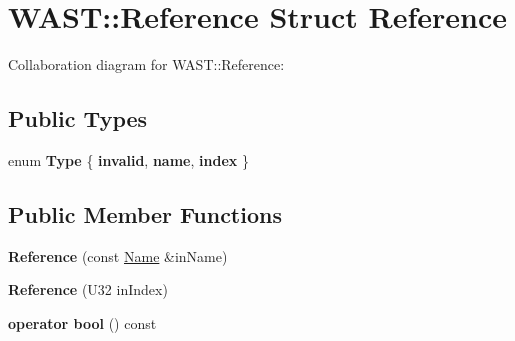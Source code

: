 \hypertarget{struct_w_a_s_t_1_1_reference}{}\section{W\+A\+ST\+:\+:Reference Struct Reference}
\label{struct_w_a_s_t_1_1_reference}


Collaboration diagram for W\+A\+ST\+:\+:Reference\+:
\subsection*{Public Types}
\begin{DoxyCompactItemize}
\item 
\mbox{\label{struct_w_a_s_t_1_1_reference_a89f893631191c7d9100fada8522b5f60}} 
enum {\bfseries Type} \{ {\bfseries invalid}, 
{\bfseries name}, 
{\bfseries index}
 \}
\end{DoxyCompactItemize}
\subsection*{Public Member Functions}
\begin{DoxyCompactItemize}
\item 
\mbox{\label{struct_w_a_s_t_1_1_reference_a137b1552cb354800b9f58197fdeaf100}} 
{\bfseries Reference} (const \mbox{\hyperlink{struct_w_a_s_t_1_1_name}{Name}} \&in\+Name)
\item 
\mbox{\label{struct_w_a_s_t_1_1_reference_ac76ec6a426abfa4a7e78f67fcda1502d}} 
{\bfseries Reference} (U32 in\+Index)
\item 
\mbox{\label{struct_w_a_s_t_1_1_reference_ade3e7a977af30d401193864c83900801}} 
{\bfseries operator bool} () const
\end{DoxyCompactItemize}
